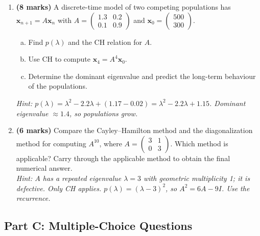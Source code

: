 \documentclass[12pt,a4paper]{article}
\begin{document}
\begin{enumerate}
  \item \textbf{(8 marks)} A discrete-time model of two competing populations has \(\mathbf{x}_{n+1} = A\mathbf{x}_n\) with
    \(A = \begin{pmatrix}1.3 & 0.2 \\ 0.1 & 0.9\end{pmatrix}\) and \(\mathbf{x}_0 = \begin{pmatrix}500\\300\end{pmatrix}\).
    \begin{enumerate}[(a)]
      \item Find \(p(\lambda)\) and the CH relation for \(A\).
      \item Use CH to compute \(\mathbf{x}_4 = A^4\mathbf{x}_0\).
      \item Determine the dominant eigenvalue and predict the long-term behaviour of the populations.
    \end{enumerate}
    \textit{Hint: \(p(\lambda)= \lambda^2 - 2.2\lambda + (1.17-0.02) = \lambda^2 - 2.2\lambda + 1.15\). Dominant eigenvalue \(\approx 1.4\), so populations grow.}

  \item \textbf{(6 marks)} Compare the Cayley--Hamilton method and the diagonalization method for computing \(A^{10}\), where \(A = \begin{pmatrix}3&1\\0&3\end{pmatrix}\). Which method is applicable? Carry through the applicable method to obtain the final numerical answer.\\
    \textit{Hint: \(A\) has a repeated eigenvalue \(\lambda = 3\) with geometric multiplicity 1; it is defective. Only CH applies. \(p(\lambda)=(\lambda-3)^2\), so \(A^2 = 6A - 9I\). Use the recurrence.}
\end{enumerate}

\subsection*{Part C: Multiple-Choice Questions}
\end{document}
